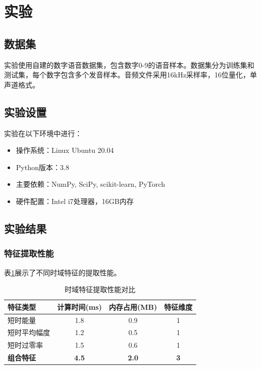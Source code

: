 \documentclass[sigconf,nonacm]{acmart}
\begin{document}
\section{实验}

\subsection{数据集}

实验使用自建的数字语音数据集，包含数字0-9的语音样本。数据集分为训练集和测试集，每个数字包含多个发音样本。音频文件采用16kHz采样率，16位量化，单声道格式。

\subsection{实验设置}

实验在以下环境中进行：
\begin{itemize}
\item 操作系统：Linux Ubuntu 20.04
\item Python版本：3.8
\item 主要依赖：NumPy, SciPy, scikit-learn, PyTorch
\item 硬件配置：Intel i7处理器，16GB内存
\end{itemize}

\subsection{实验结果}

\subsubsection{特征提取性能}

表\ref{tab:feature_performance}展示了不同时域特征的提取性能。

\begin{table}[htbp]
\caption{时域特征提取性能对比}
\label{tab:feature_performance}
\begin{center}
\begin{tabular}{lccc}
\toprule
\textbf{特征类型} & \textbf{计算时间(ms)} & \textbf{内存占用(MB)} & \textbf{特征维度} \\
\midrule
短时能量 & 1.8 & 0.9 & 1 \\
短时平均幅度 & 1.2 & 0.5 & 1 \\
短时过零率 & 1.5 & 0.6 & 1 \\
\midrule
\textbf{组合特征} & \textbf{4.5} & \textbf{2.0} & \textbf{3} \\
\bottomrule
\end{tabular}
\end{center}
\end{table}
\end{document}
